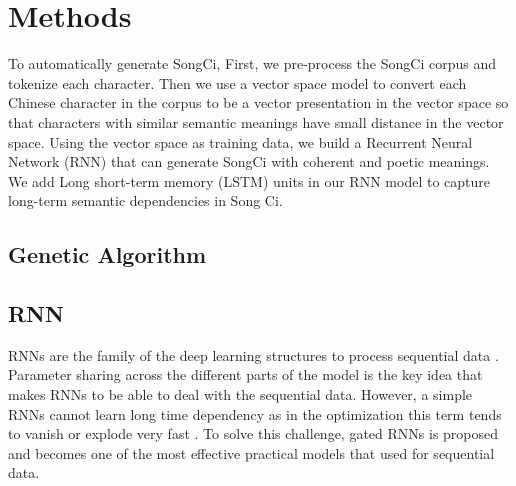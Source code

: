 \section{Methods}   
To automatically generate SongCi,  
First, we pre-process the SongCi corpus and tokenize each character.
%
Then we use a vector space model to convert each Chinese character in the corpus to be a vector presentation in the vector space so that characters with similar semantic meanings have small distance in the vector space.
%
Using the vector space as training data, we build a Recurrent Neural Network (RNN) that can generate SongCi with coherent and poetic meanings.
%
We add Long short-term memory (LSTM) units in our RNN model to capture long-term semantic dependencies in Song Ci.
\subsection{Genetic Algorithm}

\subsection{RNN}
%
%
RNNs are the family of the deep learning structures to process sequential data  \cite{rumelhart1986}. 
%
Parameter sharing across the different parts of the model is the key idea that makes RNNs to be able to deal with the sequential data. 
%
However, a simple RNNs cannot learn long time dependency as in the optimization this term tends to vanish or explode very fast \cite{goodfellow2016deeplearning}. 
%
To solve this challenge, gated RNNs is proposed and becomes one of the most effective practical models that used for sequential data.

